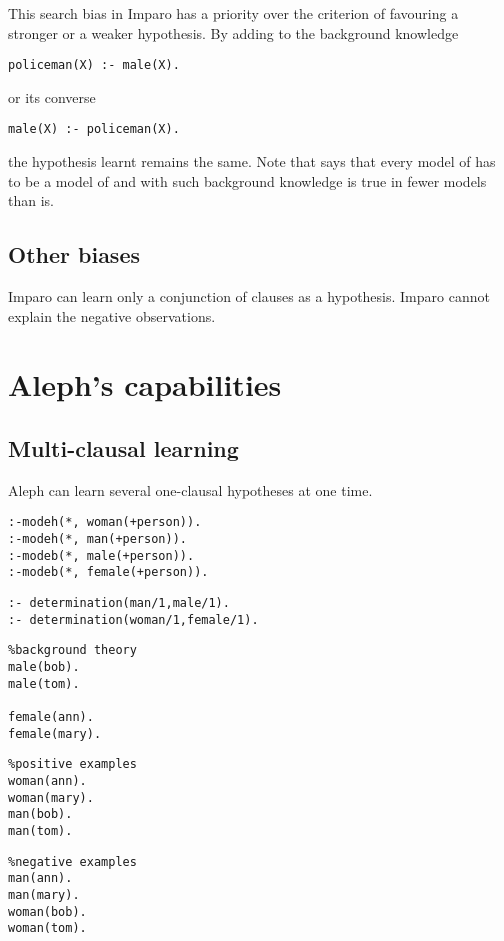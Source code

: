 This search bias in Imparo has a priority over the criterion of favouring a stronger or a weaker hypothesis. By adding to the background knowledge
\begin{lstlisting}
policeman(X) :- male(X).
\end{lstlisting}
or its converse
\begin{lstlisting}
male(X) :- policeman(X).
\end{lstlisting}
the hypothesis learnt remains the same.
Note that  says that every model of  has to be a model of  and with such background knowledge  is true in fewer models than  is.

\subsection{Other biases}
Imparo can learn only a conjunction of clauses as a hypothesis.
Imparo cannot explain the negative observations.

\section{Aleph's capabilities}

\subsection{Multi-clausal learning}
Aleph can learn several one-clausal hypotheses at one time.

\begin{minipage}[t]{.45\textwidth}
\begin{lstlisting}
:-modeh(*, woman(+person)).
:-modeh(*, man(+person)).
:-modeb(*, male(+person)).
:-modeb(*, female(+person)).
\end{lstlisting}
\end{minipage}
\begin{minipage}[t]{.20\textwidth}
\begin{lstlisting}
:- determination(man/1,male/1).
:- determination(woman/1,female/1).
\end{lstlisting}
\end{minipage}

\begin{minipage}[t]{.30\textwidth}
\begin{lstlisting}
%background theory
male(bob).
male(tom).

female(ann).
female(mary).
\end{lstlisting}
\end{minipage}
\begin{minipage}[t]{.30\textwidth}
\begin{lstlisting}
%positive examples
woman(ann).
woman(mary).
man(bob).
man(tom).
\end{lstlisting}
\end{minipage}
\begin{minipage}[t]{.30\textwidth}
\begin{lstlisting}
%negative examples
man(ann).
man(mary).
woman(bob).
woman(tom).
\end{lstlisting}
\end{minipage}

